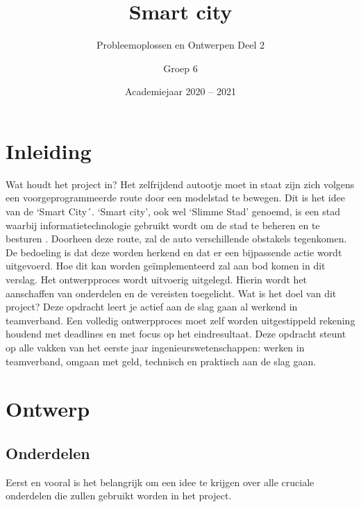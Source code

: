 \documentclass[a4paper,twoside,kulak]{kulakreport} %
\title{Smart city}
\subtitle{Probleemoplossen en Ontwerpen Deel 2}
\author{Groep 6}
\institute {Barbier Jolien, Bossuyt Mathis, De Meester Sarah, Demuynck Dieter en Jans Rani 
	
\newline o.l.v. Boussé Martijn, Maveau Benjamin en Truyaert Kevin}
\date{Academiejaar 2020 -- 2021}
\begin{document}

\titlepage

\tableofcontents
\renewcommand\thesection{\arabic{section}}
\renewcommand\thesubsection{\thesection.\arabic{subsection}}
\newpage
\section*{Inleiding}\label{Inleiding}

Wat houdt het project in? Het zelfrijdend autootje moet in staat zijn zich volgens een voorgeprogrammeerde route door een modelstad te bewegen. Dit is het idee van de `Smart City´. `Smart city', ook wel `Slimme Stad' genoemd, is een stad waarbij informatietechnologie gebruikt wordt om de stad te beheren en te besturen \cite{SmartCity}. Doorheen deze route, zal de auto verschillende obstakels tegenkomen. De bedoeling is dat deze worden herkend en dat er een bijpassende actie wordt uitgevoerd. Hoe dit kan worden geïmplementeerd zal aan bod komen in dit verslag.
Het ontwerpproces wordt uitvoerig uitgelegd. Hierin wordt het aanschaffen van onderdelen en de vereisten toegelicht.
Wat is het doel van dit project? Deze opdracht leert je actief aan de slag gaan al werkend in teamverband. Een volledig ontwerpproces moet zelf worden uitgestippeld  rekening houdend met deadlines en met focus op het eindresultaat. Deze opdracht steunt op alle vakken van het eerste jaar ingenieurswetenschappen: werken in teamverband, omgaan met geld, technisch en praktisch aan de slag gaan.
\section{Ontwerp} \label{Ontwerp}

\subsection{Onderdelen}\label{Onderdelen}

Eerst en vooral is het belangrijk om een idee te krijgen over alle cruciale onderdelen die zullen gebruikt worden in het project. 
\end{document}

